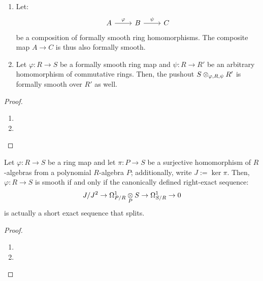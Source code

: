             \begin{proposition} \label{prop: compositions_and_base_changes_of_formally_smooth_morphisms}
                \noindent
                \begin{enumerate}
                    \item Let:
                        $$
                            \begin{tikzcd}
                            	A & B & C
                            	\arrow["\varphi", from=1-1, to=1-2]
                            	\arrow["\psi", from=1-2, to=1-3]
                            \end{tikzcd}
                        $$
                    be a composition of formally smooth ring homomorphisms. The composite map $A \to C$ is thus also formally smooth.
                    \item Let $\varphi: R \to S$ be a formally smooth ring map and $\psi: R \to R'$ be an arbitrary homomorphism of commutative rings. Then, the pushout $S \tensor_{\varphi, R, \psi} R'$ is formally smooth over $R'$ as well.
                \end{enumerate}
            \end{proposition}
                \begin{proof}
                    \noindent
                    \begin{enumerate}
                        \item 
                        \item 
                    \end{enumerate}
                \end{proof}
                
            \begin{lemma} \label{lemma: canonical_short_exact_sequence_splits}
                Let $\varphi: R \to S$ be a ring map and let $\pi: P \to S$ be a surjective homomorphism of $R$-algebras from a polynomial $R$-algebra $P$; additionally, write $J := \ker \pi$. Then, $\varphi: R \to S$ is smooth if and only if the canonically defined right-exact sequence:
                    $$J/J^2 \to \Omega^1_{P/R} \tensor_P S \to \Omega^1_{S/R} \to 0$$
                is actually a short exact sequence that splits.
            \end{lemma}
                \begin{proof}
                    \noindent
                    \begin{enumerate}
                        \item 
                        \item 
                    \end{enumerate}
                \end{proof}
            
